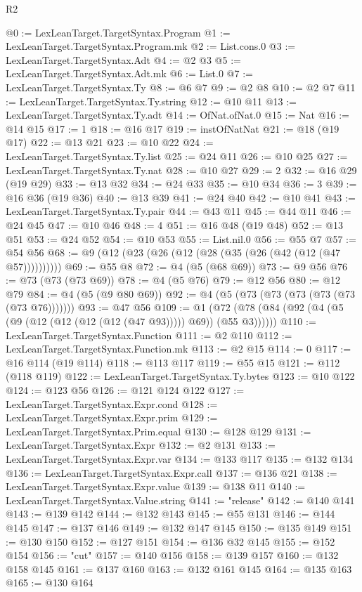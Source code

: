 \begin{lexlean}{R2}
\begin{coremodule}
@0 := LexLeanTarget.TargetSyntax.Program
@1 := LexLeanTarget.TargetSyntax.Program.mk
@2 := List.cons.{0}
@3 := LexLeanTarget.TargetSyntax.Adt
@4 := @2 @3
@5 := LexLeanTarget.TargetSyntax.Adt.mk
@6 := List.{0}
@7 := LexLeanTarget.TargetSyntax.Ty
@8 := @6 @7
@9 := @2 @8
@10 := @2 @7
@11 := LexLeanTarget.TargetSyntax.Ty.string
@12 := @10 @11
@13 := LexLeanTarget.TargetSyntax.Ty.adt
@14 := OfNat.ofNat.{0}
@15 := Nat
@16 := @14 @15
@17 := 1
@18 := @16 @17
@19 := instOfNatNat
@21 := @18 (@19 @17)
@22 := @13 @21
@23 := @10 @22
@24 := LexLeanTarget.TargetSyntax.Ty.list
@25 := @24 @11
@26 := @10 @25
@27 := LexLeanTarget.TargetSyntax.Ty.nat
@28 := @10 @27
@29 := 2
@32 := @16 @29 (@19 @29)
@33 := @13 @32
@34 := @24 @33
@35 := @10 @34
@36 := 3
@39 := @16 @36 (@19 @36)
@40 := @13 @39
@41 := @24 @40
@42 := @10 @41
@43 := LexLeanTarget.TargetSyntax.Ty.pair
@44 := @43 @11
@45 := @44 @11
@46 := @24 @45
@47 := @10 @46
@48 := 4
@51 := @16 @48 (@19 @48)
@52 := @13 @51
@53 := @24 @52
@54 := @10 @53
@55 := List.nil.{0}
@56 := @55 @7
@57 := @54 @56
@68 := @9 (@12 (@23 (@26 (@12 (@28 (@35 (@26 (@42 (@12 (@47 @57))))))))))
@69 := @55 @8
@72 := @4 (@5 (@68 @69))
@73 := @9 @56
@76 := @73 (@73 (@73 @69))
@78 := @4 (@5 @76)
@79 := @12 @56
@80 := @12 @79
@84 := @4 (@5 (@9 @80 @69))
@92 := @4 (@5 (@73 (@73 (@73 (@73 (@73 (@73 @76)))))))
@93 := @47 @56
@109 := @1 (@72 (@78 (@84 (@92 (@4 (@5 (@9 (@12 (@12 (@12 (@12 (@47 @93))))) @69)) (@55 @3))))))
@110 := LexLeanTarget.TargetSyntax.Function
@111 := @2 @110
@112 := LexLeanTarget.TargetSyntax.Function.mk
@113 := @2 @15
@114 := 0
@117 := @16 @114 (@19 @114)
@118 := @113 @117
@119 := @55 @15
@121 := @112 (@118 @119)
@122 := LexLeanTarget.TargetSyntax.Ty.bytes
@123 := @10 @122
@124 := @123 @56
@126 := @121 @124 @122
@127 := LexLeanTarget.TargetSyntax.Expr.cond
@128 := LexLeanTarget.TargetSyntax.Expr.prim
@129 := LexLeanTarget.TargetSyntax.Prim.equal
@130 := @128 @129
@131 := LexLeanTarget.TargetSyntax.Expr
@132 := @2 @131
@133 := LexLeanTarget.TargetSyntax.Expr.var
@134 := @133 @117
@135 := @132 @134
@136 := LexLeanTarget.TargetSyntax.Expr.call
@137 := @136 @21
@138 := LexLeanTarget.TargetSyntax.Expr.value
@139 := @138 @11
@140 := LexLeanTarget.TargetSyntax.Value.string
@141 := "release"
@142 := @140 @141
@143 := @139 @142
@144 := @132 @143
@145 := @55 @131
@146 := @144 @145
@147 := @137 @146
@149 := @132 @147 @145
@150 := @135 @149
@151 := @130 @150
@152 := @127 @151
@154 := @136 @32 @145
@155 := @152 @154
@156 := "cut"
@157 := @140 @156
@158 := @139 @157
@160 := @132 @158 @145
@161 := @137 @160
@163 := @132 @161 @145
@164 := @135 @163
@165 := @130 @164

\end{coremodule}
\end{lexlean}
